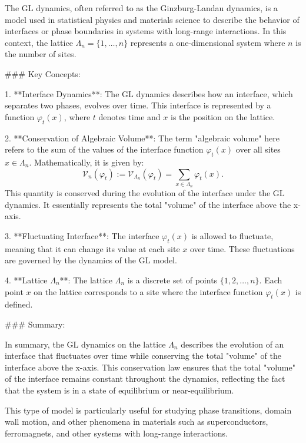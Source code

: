 The GL dynamics, often referred to as the Ginzburg-Landau dynamics, is a model used in statistical physics and materials science to describe the behavior of interfaces or phase boundaries in systems with long-range interactions. In this context, the lattice \(\Lambda_n = \{1, \ldots, n\}\) represents a one-dimensional system where \(n\) is the number of sites.

### Key Concepts:

1. **Interface Dynamics**: The GL dynamics describes how an interface, which separates two phases, evolves over time. This interface is represented by a function \(\varphi_t(x)\), where \(t\) denotes time and \(x\) is the position on the lattice.

2. **Conservation of Algebraic Volume**: The term "algebraic volume" here refers to the sum of the values of the interface function \(\varphi_t(x)\) over all sites \(x \in \Lambda_n\). Mathematically, it is given by:
   \[
   \mathcal{V}_n(\varphi_t) := \mathcal{V}_{\Lambda_n}(\varphi_t) = \sum_{x \in \Lambda_n} \varphi_t(x).
   \]
   This quantity is conserved during the evolution of the interface under the GL dynamics. It essentially represents the total "volume" of the interface above the x-axis.

3. **Fluctuating Interface**: The interface \(\varphi_t(x)\) is allowed to fluctuate, meaning that it can change its value at each site \(x\) over time. These fluctuations are governed by the dynamics of the GL model.

4. **Lattice \(\Lambda_n\)**: The lattice \(\Lambda_n\) is a discrete set of points \(\{1, 2, \ldots, n\}\). Each point \(x\) on the lattice corresponds to a site where the interface function \(\varphi_t(x)\) is defined.

### Summary:

In summary, the GL dynamics on the lattice \(\Lambda_n\) describes the evolution of an interface that fluctuates over time while conserving the total "volume" of the interface above the x-axis. This conservation law ensures that the total "volume" of the interface remains constant throughout the dynamics, reflecting the fact that the system is in a state of equilibrium or near-equilibrium.

This type of model is particularly useful for studying phase transitions, domain wall motion, and other phenomena in materials such as superconductors, ferromagnets, and other systems with long-range interactions.